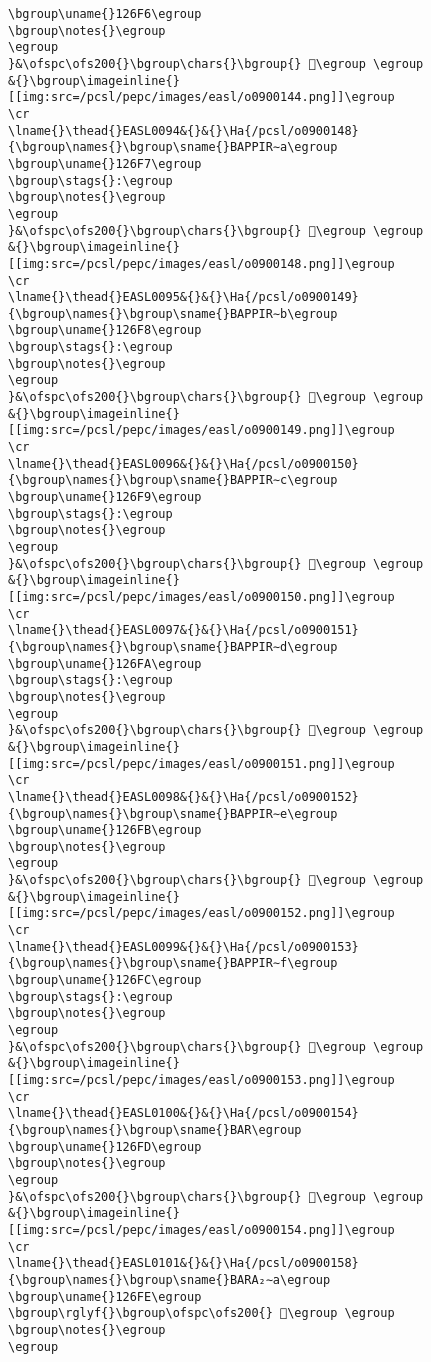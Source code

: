 \begin{verbatim}
\bgroup\uname{}126F6\egroup
\bgroup\notes{}\egroup
\egroup
}&\ofspc\ofs200{}\bgroup\chars{}\bgroup{} 𒛶\egroup \egroup
&{}\bgroup\imageinline{}[[img:src=/pcsl/pepc/images/easl/o0900144.png]]\egroup
\cr
\lname{}\thead{}EASL0094&{}&{}\Ha{/pcsl/o0900148}{\bgroup\names{}\bgroup\sname{}BAPPIR∼a\egroup
\bgroup\uname{}126F7\egroup
\bgroup\stags{}:\egroup
\bgroup\notes{}\egroup
\egroup
}&\ofspc\ofs200{}\bgroup\chars{}\bgroup{} 𒛷\egroup \egroup
&{}\bgroup\imageinline{}[[img:src=/pcsl/pepc/images/easl/o0900148.png]]\egroup
\cr
\lname{}\thead{}EASL0095&{}&{}\Ha{/pcsl/o0900149}{\bgroup\names{}\bgroup\sname{}BAPPIR∼b\egroup
\bgroup\uname{}126F8\egroup
\bgroup\stags{}:\egroup
\bgroup\notes{}\egroup
\egroup
}&\ofspc\ofs200{}\bgroup\chars{}\bgroup{} 𒛸\egroup \egroup
&{}\bgroup\imageinline{}[[img:src=/pcsl/pepc/images/easl/o0900149.png]]\egroup
\cr
\lname{}\thead{}EASL0096&{}&{}\Ha{/pcsl/o0900150}{\bgroup\names{}\bgroup\sname{}BAPPIR∼c\egroup
\bgroup\uname{}126F9\egroup
\bgroup\stags{}:\egroup
\bgroup\notes{}\egroup
\egroup
}&\ofspc\ofs200{}\bgroup\chars{}\bgroup{} 𒛹\egroup \egroup
&{}\bgroup\imageinline{}[[img:src=/pcsl/pepc/images/easl/o0900150.png]]\egroup
\cr
\lname{}\thead{}EASL0097&{}&{}\Ha{/pcsl/o0900151}{\bgroup\names{}\bgroup\sname{}BAPPIR∼d\egroup
\bgroup\uname{}126FA\egroup
\bgroup\stags{}:\egroup
\bgroup\notes{}\egroup
\egroup
}&\ofspc\ofs200{}\bgroup\chars{}\bgroup{} 𒛺\egroup \egroup
&{}\bgroup\imageinline{}[[img:src=/pcsl/pepc/images/easl/o0900151.png]]\egroup
\cr
\lname{}\thead{}EASL0098&{}&{}\Ha{/pcsl/o0900152}{\bgroup\names{}\bgroup\sname{}BAPPIR∼e\egroup
\bgroup\uname{}126FB\egroup
\bgroup\notes{}\egroup
\egroup
}&\ofspc\ofs200{}\bgroup\chars{}\bgroup{} 𒛻\egroup \egroup
&{}\bgroup\imageinline{}[[img:src=/pcsl/pepc/images/easl/o0900152.png]]\egroup
\cr
\lname{}\thead{}EASL0099&{}&{}\Ha{/pcsl/o0900153}{\bgroup\names{}\bgroup\sname{}BAPPIR∼f\egroup
\bgroup\uname{}126FC\egroup
\bgroup\stags{}:\egroup
\bgroup\notes{}\egroup
\egroup
}&\ofspc\ofs200{}\bgroup\chars{}\bgroup{} 𒛼\egroup \egroup
&{}\bgroup\imageinline{}[[img:src=/pcsl/pepc/images/easl/o0900153.png]]\egroup
\cr
\lname{}\thead{}EASL0100&{}&{}\Ha{/pcsl/o0900154}{\bgroup\names{}\bgroup\sname{}BAR\egroup
\bgroup\uname{}126FD\egroup
\bgroup\notes{}\egroup
\egroup
}&\ofspc\ofs200{}\bgroup\chars{}\bgroup{} 𒛽\egroup \egroup
&{}\bgroup\imageinline{}[[img:src=/pcsl/pepc/images/easl/o0900154.png]]\egroup
\cr
\lname{}\thead{}EASL0101&{}&{}\Ha{/pcsl/o0900158}{\bgroup\names{}\bgroup\sname{}BARA₂∼a\egroup
\bgroup\uname{}126FE\egroup
\bgroup\rglyf{}\bgroup\ofspc\ofs200{} 𒛾\egroup \egroup
\bgroup\notes{}\egroup
\egroup

\end{verbatim}
